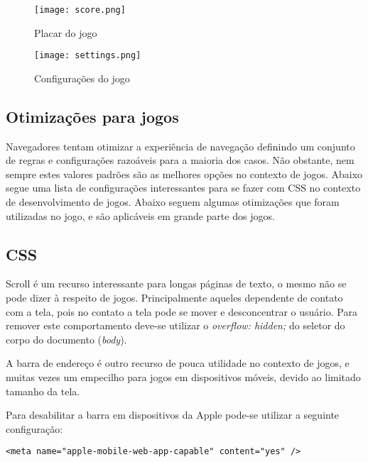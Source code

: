 \begin{figure}
    \centering
    \texttt{[image: score.png]}
	\caption{Placar do jogo}
    \label{fig:placar}
\end{figure}

\begin{figure}
    \centering
    \texttt{[image: settings.png]}
	\caption{Configurações do jogo}
    \label{fig:cofigurations}
\end{figure}

\begin{draft}

\section{Otimizações para jogos}

Navegadores tentam otimizar a experiência de navegação definindo
um conjunto de regras e configurações razoáveis para a maioria dos
casos. Não obstante, nem sempre estes valores padrões são as melhores
opções no contexto de jogos. Abaixo segue uma lista de configurações
interessantes para se fazer com CSS no contexto de desenvolvimento de
jogos.
Abaixo seguem algumas otimizações que foram utilizadas no jogo, e são  aplicáveis 
em grande parte dos jogos.

\subsection{CSS}

Scroll é um recurso interessante para longas páginas de texto,
o mesmo não se pode dizer à respeito de jogos.
Principalmente aqueles dependente de contato com a tela, pois
no contato a tela pode se mover e desconcentrar o usuário. Para
remover este comportamento deve-se utilizar o \textit{overflow:
hidden;} do seletor do corpo do documento (\textit{body}).

A barra de endereço é outro recurso de pouca utilidade no contexto de
jogos, e muitas vezes um empecilho para jogos em dispositivos móveis,
devido ao limitado tamanho da tela.

Para desabilitar a barra em dispositivos da Apple pode-se utilizar a
seguinte configuração:

\begin{verbatim}
<meta name="apple-mobile-web-app-capable" content="yes" />
\end{verbatim}


\end{draft}
